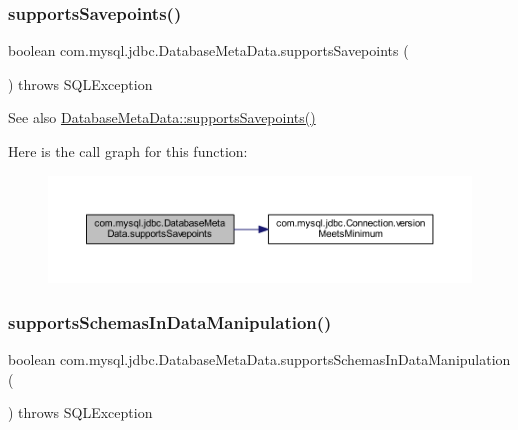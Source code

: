 \subsubsection{\texorpdfstring{supports\+Savepoints()}{supportsSavepoints()}}
{\footnotesize\ttfamily boolean com.\+mysql.\+jdbc.\+Database\+Meta\+Data.\+supports\+Savepoints (\begin{DoxyParamCaption}{ }\end{DoxyParamCaption}) throws S\+Q\+L\+Exception}

\begin{DoxySeeAlso}{See also}
\mbox{\hyperlink{classcom_1_1mysql_1_1jdbc_1_1_database_meta_data_ad320246c571d9f4597ffae3acbb781f6}{Database\+Meta\+Data\+::supports\+Savepoints()}} 
\end{DoxySeeAlso}
Here is the call graph for this function\+:
\nopagebreak
\begin{figure}[H]
\begin{center}
\leavevmode
\includegraphics[width=350pt]{classcom_1_1mysql_1_1jdbc_1_1_database_meta_data_ad320246c571d9f4597ffae3acbb781f6_cgraph}
\end{center}
\end{figure}
\mbox{\label{classcom_1_1mysql_1_1jdbc_1_1_database_meta_data_a461feee50c67174a4b4bcd36c2588d87}} 
\subsubsection{\texorpdfstring{supports\+Schemas\+In\+Data\+Manipulation()}{supportsSchemasInDataManipulation()}}
{\footnotesize\ttfamily boolean com.\+mysql.\+jdbc.\+Database\+Meta\+Data.\+supports\+Schemas\+In\+Data\+Manipulation (\begin{DoxyParamCaption}{ }\end{DoxyParamCaption}) throws S\+Q\+L\+Exception}

